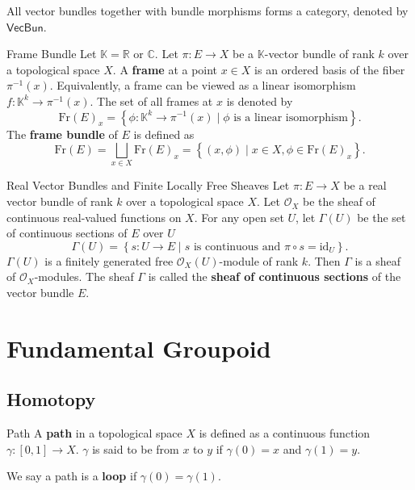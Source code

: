 \documentclass{report}
\begin{document}
All vector bundles together with bundle morphisms forms a category, denoted by $\mathsf{VecBun}$.

\begin{definition}{Frame Bundle}{}
	Let $\mathbb{K}=\mathbb{R}\text{ or }\mathbb{C}$. Let $\pi:E\to X$ be a $\mathbb{K}$-vector bundle of rank $k$ over a topological space $X$. A \textbf{frame} at a point $x\in X$ is an ordered basis of the fiber $\pi^{-1}(x)$. Equivalently, a frame can be viewed as a linear isomorphism $f:\mathbb{K}^k\to \pi^{-1}(x)$. The set of all frames at $x$ is denoted by
	\[
		\mathrm{Fr}(E)_x=\left\{\phi:\mathbb{K}^k\longrightarrow \pi^{-1}(x)\mid \phi\text{ is a linear isomorphism}\right\}.
	\]
	The \textbf{frame bundle} of $E$ is defined as
	\[
		\mathrm{Fr}(E)=\bigsqcup_{x\in X}\mathrm{Fr}(E)_x =\left\{(x,\phi)\mid x\in X,\phi\in \mathrm{Fr}(E)_x\right\}.
	\]
\end{definition}

\begin{proposition}{Real Vector Bundles and Finite Locally Free Sheaves}{}
	Let $\pi:E\to X$ be a real vector bundle of rank $k$ over a topological space $X$. Let $\mathcal{O}_X$ be the sheaf of continuous real-valued functions on $X$. For any open set $U$, let $\Gamma(U)$ be the set of continuous sections of $E$ over $U$
	\[
		\Gamma(U)=\left\{s:U\to E\mid s\text{ is continuous and }\pi\circ s=\mathrm{id}_U\right\}.
	\]
	$\Gamma(U)$ is a finitely generated free $\mathcal{O}_X(U)$-module of rank $k$. Then $\Gamma$ is a sheaf of $\mathcal{O}_X$-modules. The sheaf $\Gamma$ is called the \textbf{sheaf of continuous sections} of the vector bundle $E$. 
	
\end{proposition}


\chapter{Fundamental Groupoid}
\section{Homotopy}
\begin{definition}{Path}{}
	A \textbf{path} in a topological space $X$ is defined as a continuous function $\gamma:[0,1]\to X$. $\gamma$ is said to be from $x$ to $y$ if $\gamma(0)=x$ and $\gamma(1)=y$.
\end{definition}

We say a path is a \textbf{loop} if $\gamma(0)=\gamma(1)$.
\end{document}
